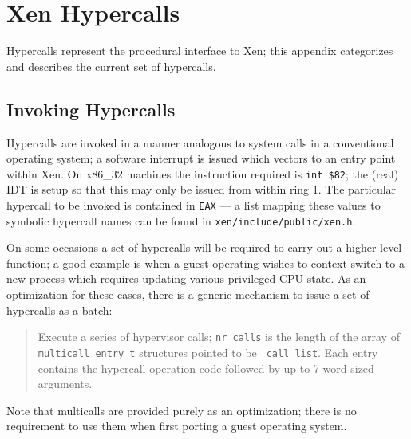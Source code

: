 \documentclass[11pt,twoside,final,openright]{xenstyle}
\begin{document}
\appendix






\newcommand{\hypercall}[1]{\vspace{2mm}{\sf #1}}






\chapter{Xen Hypercalls}
\label{a:hypercalls}

Hypercalls represent the procedural interface to Xen; this appendix 
categorizes and describes the current set of hypercalls. 

\section{Invoking Hypercalls} 

Hypercalls are invoked in a manner analogous to system calls in a
conventional operating system; a software interrupt is issued which
vectors to an entry point within Xen. On x86\_32 machines the
instruction required is {\tt int \$82}; the (real) IDT is setup so
that this may only be issued from within ring 1. The particular 
hypercall to be invoked is contained in {\tt EAX} --- a list 
mapping these values to symbolic hypercall names can be found 
in {\tt xen/include/public/xen.h}. 

On some occasions a set of hypercalls will be required to carry
out a higher-level function; a good example is when a guest 
operating wishes to context switch to a new process which 
requires updating various privileged CPU state. As an optimization
for these cases, there is a generic mechanism to issue a set of 
hypercalls as a batch: 

\begin{quote}
\hypercall{multicall(void *call\_list, int nr\_calls)}

Execute a series of hypervisor calls; {\tt nr\_calls} is the length of
the array of {\tt multicall\_entry\_t} structures pointed to be {\tt
call\_list}. Each entry contains the hypercall operation code followed
by up to 7 word-sized arguments.
\end{quote}

Note that multicalls are provided purely as an optimization; there is
no requirement to use them when first porting a guest operating
system.
\end{document}
